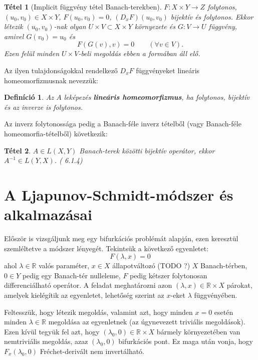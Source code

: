 \documentclass[oneside, titlepage, 12pt, a4paper]{report}
\newtheorem{theorem}{Tétel}[section]
\newtheorem{definition}{Definíció}[section]
\begin{document}
\begin{theorem}[Implicit függvény tétel Banach-terekben]
\label{implicit}
$F : X \times Y \rightarrow Z$ folytonos, $(u_0, v_0) \in X \times Y$, $F(u_0, v_0) = 0$, $(D_xF)(u_0, v_0)$ bijektív és folytonos. Ekkor létezik $(u_0, v_0)$-nak olyan $U \times V \subset X \times Y$ környezete és $G:V \rightarrow U$ függvény, amivel $G(v_0) = u_0$ és
\begin{equation*}
F(G(v), v) = 0 \qquad (\forall v \in V).
\end{equation*}
Ezen felül minden $U \times V$-beli megoldás ebben a formában áll elő. \cite{IFaLS}
\end{theorem}
Az ilyen tulajdonságokkal rendelkező $D_xF$ függvényeket lineáris homeomorfizmusnak nevezzük:
\begin{definition}
Az $A$ leképezés \textbf{lineáris homeomorfizmus}, ha folytonos, bijektív és az inverze is folytonos.
\end{definition}
Az inverz folytonossága pedig a Banach-féle inverz tételből (vagy Banach-féle homeomorfia-tételből) következik:
\begin{theorem}
$A \in L(X, Y)$ Banach-terek közötti bijektív operátor, ekkor $A^{-1} \in L(Y, X)$. (\cite{funkanal} 6.1.4) %
\end{theorem}


\onehalfspacing
\chapter{A Ljapunov-Schmidt-módszer és alkalmazásai}
\label{chap:LjapunovSchmidt}

Először is vizsgáljunk meg egy bifurkációs problémát \cite{CSiAM} alapján, ezen keresztül szemléltetve a módszer lényegét. Tekintsük a következő egyenletet:
\begin{equation*}
F(\lambda, x) = 0
\end{equation*}
ahol $\lambda \in \mathbb{R}$ valós paraméter, $x \in X$ állapotváltozó (TODO ?) $X$ Banach-térben, $0 \in Y$ pedig egy Banach-tér nulleleme, $F$ pedig kétszer folytonosan differenciálható operátor. A feladat meghatározni azon $(\lambda, x) \in \mathbb{R} \times X$ párokat, amelyek kielégítik az egyenletet, lehetőség szerint az $x$-eket $\lambda$ függvényében.

Feltesszük, hogy létezik megoldás, valamint azt, hogy minden $x = 0$ esetén minden $\lambda \in \mathbb{R}$ megoldása az egyenletnek (az úgynevezett triviális megoldások). Ezen kívül tegyük fel azt, hogy $(\lambda_0, 0) \in \mathbb{R} \times X$ bármely környezetében van nemtriviális megoldás, azaz $(\lambda_0, 0)$ bifurkációs pont. Ez maga után vonja, hogy $F_x(\lambda_0, 0)$ Fréchet-derivált nem invertálható.
\end{document}
